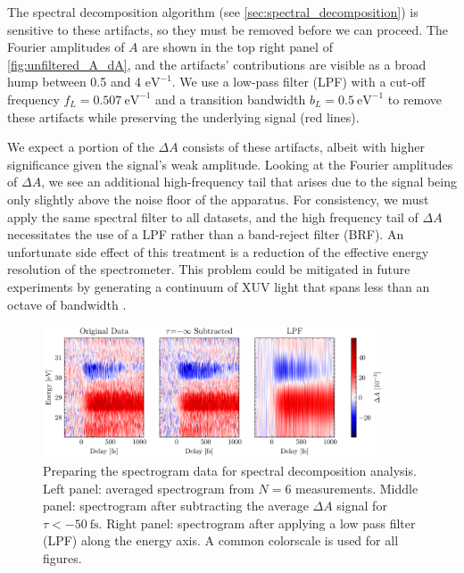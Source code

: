 The spectral decomposition algorithm (see \cref{sec:spectral_decomposition}) is sensitive to these artifacts, so they must be removed before we can proceed. The Fourier amplitudes of $A$ are shown in the top right panel of \cref{fig:unfiltered_A_dA}, and the artifacts' contributions are visible as a broad hump between 0.5 and 4 $\textrm{eV}^{-1}$. We use a low-pass filter (LPF) with a cut-off frequency $f_L = 0.507 \ \textrm{eV}^{-1}$ and a transition bandwidth $b_L = 0.5 \ \textrm{eV}^{-1}$ to remove these artifacts while preserving the underlying signal (red lines).

We expect a portion of the $\Delta A$ consists of these artifacts, albeit with higher significance given the signal's weak amplitude. Looking at the Fourier amplitudes of $\Delta A$, we see an additional high-frequency tail that arises due to the signal being only slightly above the noise floor of the apparatus. For consistency, we must apply the same spectral filter to all datasets, and the high frequency tail of $\Delta A$ necessitates the use of a LPF rather than a band-reject filter (BRF). An unfortunate side effect of this treatment is a reduction of the effective energy resolution of the spectrometer. This problem could be mitigated in future experiments by generating a continuum of XUV light that spans less than an octave of bandwidth \cite{zurchDirectSimultaneousObservation2017}.

\begin{figure}
	\centering
	\includegraphics[width=0.9\textwidth]{figures/chap4/orig_sub_filt_spectrogram.pdf}
	\caption{Preparing the spectrogram data for spectral decomposition analysis. Left panel: averaged spectrogram from $N=6$ measurements. Middle panel: spectrogram after subtracting the average $\Delta A$ signal for $\tau < - 50 \ \textrm{fs}$. Right panel: spectrogram after applying a low pass filter (LPF) along the energy axis. A common colorscale is used for all figures.}
	\label{fig:orig_sub_filt_spectrogram}
\end{figure}

